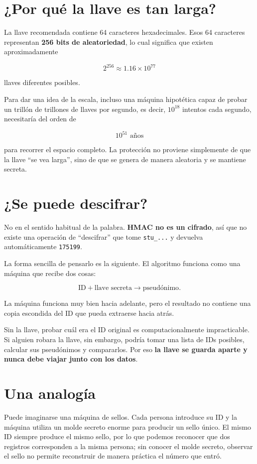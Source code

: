 \documentclass[11pt,a4paper]{article}
\begin{document}
\section{¿Por qué la llave es tan larga?}

La llave recomendada contiene 64 caracteres hexadecimales. Esos 64 caracteres representan \textbf{256 bits de aleatoriedad}, lo cual significa que existen aproximadamente

\[
2^{256}\approx 1.16\times10^{77}
\]

llaves diferentes posibles.

Para dar una idea de la escala, incluso una máquina hipotética capaz de probar un trillón de trillones de llaves por segundo, es decir, $10^{18}$ intentos cada segundo, necesitaría del orden de

\[
10^{51}\text{ años}
\]

para recorrer el espacio completo. La protección no proviene simplemente de que la llave ``se vea larga'', sino de que se genera de manera aleatoria y se mantiene secreta.

\section{¿Se puede descifrar?}

No en el sentido habitual de la palabra. \textbf{HMAC no es un cifrado}, así que no existe una operación de ``descifrar'' que tome \texttt{stu\_...} y devuelva automáticamente \texttt{175199}.

La forma sencilla de pensarlo es la siguiente. El algoritmo funciona como una máquina que recibe dos cosas:

\[
\text{ID}+\text{llave secreta}
\longrightarrow
\text{pseudónimo}.
\]

La máquina funciona muy bien hacia adelante, pero el resultado no contiene una copia escondida del ID que pueda extraerse hacia atrás.

Sin la llave, probar cuál era el ID original es computacionalmente impracticable. Si alguien robara la llave, sin embargo, podría tomar una lista de IDs posibles, calcular sus pseudónimos y compararlos. Por eso \textbf{la llave se guarda aparte y nunca debe viajar junto con los datos}.

\section{Una analogía}

Puede imaginarse una máquina de sellos. Cada persona introduce su ID y la máquina utiliza un molde secreto enorme para producir un sello único. El mismo ID siempre produce el mismo sello, por lo que podemos reconocer que dos registros corresponden a la misma persona; sin conocer el molde secreto, observar el sello no permite reconstruir de manera práctica el número que entró.
\end{document}
